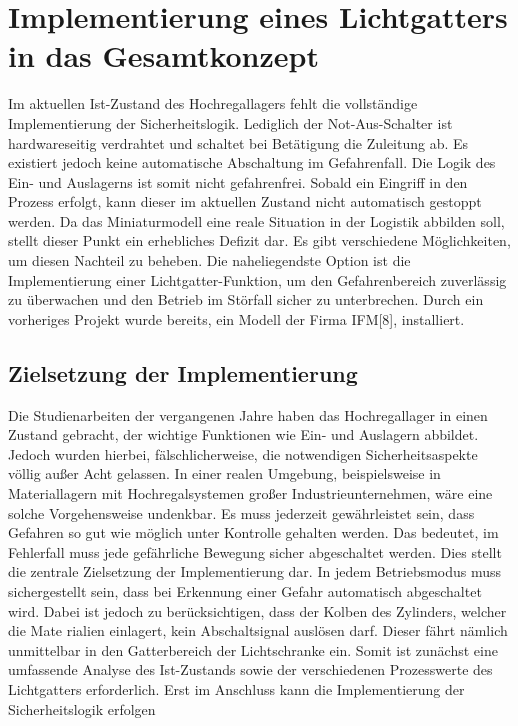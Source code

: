 \section{Implementierung eines Lichtgatters in das Gesamtkonzept}

Im aktuellen Ist-Zustand des Hochregallagers fehlt die vollständige Implementierung
der Sicherheitslogik.
Lediglich der Not-Aus-Schalter ist hardwareseitig verdrahtet und schaltet bei Betätigung
die Zuleitung ab. Es existiert jedoch keine automatische Abschaltung im Gefahrenfall.
Die Logik des Ein- und Auslagerns ist somit nicht gefahrenfrei. Sobald ein Eingriff in den
Prozess erfolgt, kann dieser im aktuellen Zustand nicht automatisch gestoppt werden.
Da das Miniaturmodell eine reale Situation in der Logistik abbilden soll, stellt dieser
Punkt ein erhebliches Defizit dar.
Es gibt verschiedene Möglichkeiten, um diesen Nachteil zu beheben. Die naheliegendste
Option ist die Implementierung einer Lichtgatter-Funktion, um den Gefahrenbereich
zuverlässig zu überwachen und den Betrieb im Störfall sicher zu unterbrechen. Durch
ein vorheriges Projekt wurde bereits, ein Modell der Firma IFM[8], installiert.

\subsection{Zielsetzung der Implementierung}
Die Studienarbeiten der vergangenen Jahre haben das Hochregallager in einen Zustand
gebracht, der wichtige Funktionen wie Ein- und Auslagern abbildet.
Jedoch wurden hierbei, fälschlicherweise, die notwendigen Sicherheitsaspekte völlig
außer Acht gelassen.
In einer realen Umgebung, beispielsweise in Materiallagern mit Hochregalsystemen
großer Industrieunternehmen, wäre eine solche Vorgehensweise undenkbar.
Es muss jederzeit gewährleistet sein, dass Gefahren so gut wie möglich unter Kontrolle
gehalten werden. Das bedeutet, im Fehlerfall muss jede gefährliche Bewegung sicher
abgeschaltet werden.
Dies stellt die zentrale Zielsetzung der Implementierung dar. In jedem Betriebsmodus
muss sichergestellt sein, dass bei Erkennung einer Gefahr automatisch abgeschaltet
wird.
Dabei ist jedoch zu berücksichtigen, dass der Kolben des Zylinders, welcher die Mate
rialien einlagert, kein Abschaltsignal auslösen darf. Dieser fährt nämlich unmittelbar in
den Gatterbereich der Lichtschranke ein.
Somit ist zunächst eine umfassende Analyse des Ist-Zustands sowie der verschiedenen
Prozesswerte des Lichtgatters erforderlich.
Erst im Anschluss kann die Implementierung der Sicherheitslogik erfolgen

